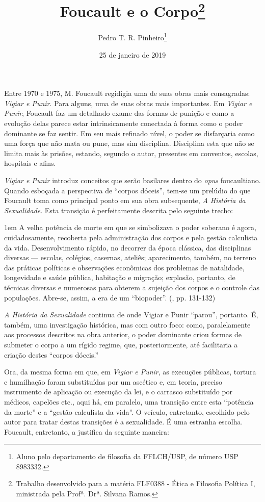 \documentclass[12pt,a4paper]{article}
\author{Pedro T. R. Pinheiro\footnote{Aluno pelo departamento de filosofia 
da FFLCH/USP, de número USP 8983332. }}
\title{Foucault e o Corpo\footnote{
	Trabalho desenvolvido para a matéria FLF0388 - Ética e Filosofia 
	Política I, ministrada pela Profª. Drª. Silvana Ramos. }}
\date{25 de janeiro de 2019}
\newenvironment{citac}
{
	\begin{addmargin}
		[4cm]{1em} \footnotesize}{\normalfont 
	\end{addmargin}
}
\begin{document}
	\maketitle
	
	\onehalfspacing
	\setlength{\parskip}{0.5cm}
	
	Entre 1970 e 1975, M. Foucault regidigia uma de suas obras mais 
	consagradas: \textit{Vigiar e Punir}. Para alguns, uma de suas 
	obras mais importantes. Em \textit{Vigiar e Punir}, Foucault faz 
	um detalhado exame das formas de punição e como a evolução delas 
	parece estar intrinsicamente conectada à forma como o poder dominante 
	se faz sentir. Em seu mais refinado nível, o poder se disfarçaria 
	como uma força que não mata ou pune, mas sim disciplina. Disciplina 
	esta que não se limita mais às prisões, estando, segundo o autor, 
	presentes em conventos, escolas, hospitais e afins. 
	
	\textit{Vigiar e Punir} introduz conceitos que serão basilares 
	dentro do \textit{opus} foucaultiano. Quando esboçada a perspectiva 
	de ``corpos dóceis'', tem-se um prelúdio do que Foucault toma como 
	principal ponto em sua obra subsequente, \textit{A História da 
	Sexualidade}. Esta transição é perfeitamente descrita pelo seguinte 
	trecho: 
	
	\begin{citac}
	A velha potência de morte em que se simbolizava o poder soberano 
	é agora, cuidadosamente, recoberta pela administração dos corpos e pela 
	gestão calculista da vida. Desenvolvimento rápido, no decorrer da época 
	clássica, das disciplinas diversas --- escolas, colégios, casernas, 
	ateliês; aparecimento, também, no terreno das práticas políticas e 
	observações econômicas dos problemas de natalidade, longevidade e 
	saúde pública, habitação e migração; explosão, portanto, de técnicas 
	diversas e numerosas para obterem a sujeição dos corpos e o controle 
	das populações. Abre-se, assim, a era de um ``biopoder''. 
	(\cite{hs}, pp. 131-132)
	\end{citac}
	
	\textit{A História da Sexualidade} continua de onde {Vigiar e Punir} 
	``parou'', portanto. É, também, uma investigação histórica, mas com 
	outro foco: como, paralelamente aos processos descritos na obra anterior, 
	o poder dominante criou formas de submeter o corpo a um rígido regime, 
	que, posteriormente, até facilitaria a criação destes ``corpos dóceis.''
	
	\newpage
	
	Ora, da mesma forma em que, em \textit{Vigiar e Punir}, as execuções 
	públicas, tortura e humilhação foram substituídas por um ascético e, em 
	teoria, preciso instrumento de aplicação ou execução da lei, e o carrasco 
	substituído por médicos, capelões etc., aqui há, em paralelo, uma 
	transição entre esta ``potência da morte'' e a ``gestão calculista da 
	vida''. O veículo, entretanto, escolhido pelo autor para tratar destas 
	transições é a sexualidade. É uma estranha escolha. Foucault, entretanto, 
	a justifica da seguinte maneira: 
	
\end{document}
